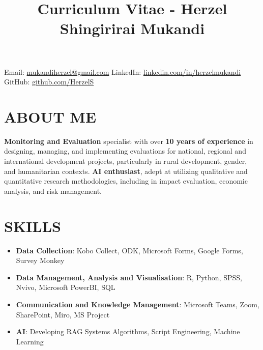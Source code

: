 \documentclass[
  10pt,
]{article}
\title{Curriculum Vitae - Herzel Shingirirai Mukandi}
\author{}
\date{\vspace{-2.5em}}
\begin{document}
\maketitle

\vspace{-2em}

\begin{center}
{\small
Email: \textcolor{blue}{\href{mailto:mukandiherzel@gmail.com}{mukandiherzel@gmail.com}} \quad
LinkedIn: \textcolor{blue}{\href{https://www.linkedin.com/in/herzelmukandi}{linkedin.com/in/herzelmukandi}} \quad
GitHub: \textcolor{blue}{\href{https://github.com/HerzelS}{github.com/HerzelS}}
}
\end{center}

\vspace{0.5em}

\section{ABOUT ME}\label{about-me}

\textbf{Monitoring and Evaluation} specialist with over \textbf{10 years
of experience} in designing, managing, and implementing evaluations for
national, regional and international development projects, particularly in rural development, gender, and humanitarian contexts. \textbf{AI enthusiast}, adept at utilizing qualitative and quantitative research methodologies, including in
impact evaluation, economic analysis, and risk management.

\vspace{0.5cm}

\section{SKILLS}\label{skills}

\begin{itemize}
\item
  \textbf{Data Collection}: Kobo Collect, ODK, Microsoft Forms, Google
  Forms, Survey Monkey
\item
  \textbf{Data Management, Analysis and Visualisation}: R, Python, SPSS,
  Nvivo, Microsoft PowerBI, SQL
\item
  \textbf{Communication and Knowledge Management}: Microsoft Teams,
  Zoom, SharePoint, Miro, MS Project
\item
  \textbf{AI}: Developing RAG Systems Algorithms, Script Engineering, Machine Learning
\end{itemize}
\end{document}
